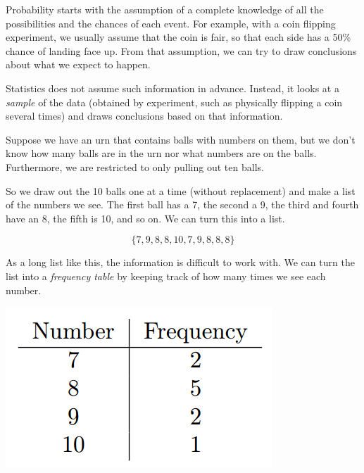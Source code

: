 \documentclass{ximera}
\begin{document}
Probability starts with the assumption of a complete knowledge of all the possibilities and the chances of each event. For example, with a coin flipping experiment, we usually assume that the coin is fair, so that each side has a 50\% chance of landing face up. From that assumption, we can try to draw conclusions about what we expect to happen.

Statistics does not assume such information in advance. Instead, it looks at a \emph{sample} of the data (obtained by experiment, such as physically flipping a coin several times) and draws conclusions based on that information.

Suppose we have an urn that contains balls with numbers on them, but we don't know how many balls are in the urn nor what numbers are on the balls. Furthermore, we are restricted to only pulling out ten balls.

So we draw out the 10 balls one at a time (without replacement) and make a list of the numbers we see. The first ball has a 7, the second a 9, the third and fourth have an 8, the fifth is 10, and so on. We can turn this into a list.

\[ \{ 7, 9, 8, 8, 10, 7, 9, 8, 8, 8 \} \]

As a long list like this, the information is difficult to work with. We can turn the list into a \emph{frequency table} by keeping track of how many times we see each number.

\begin{image}
\includegraphics{StatsTable1.png}
\end{image}
\end{document}
